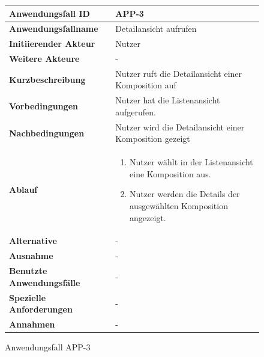 \begin{figure}[h]
	\centering
	\begin{tabularx}{\textwidth}{ X | X }
		\textbf{Anwendungsfall ID} & APP-3 \\ \hline
		\textbf{Anwendungsfallname} & Detailansicht aufrufen \\ \hline
		\textbf{Initiierender Akteur} & Nutzer \\ \hline
		\textbf{Weitere Akteure} & -  \\ \hline
		\textbf{Kurzbeschreibung} & Nutzer ruft die Detailansicht einer Komposition auf  \\ \hline
		\textbf{Vorbedingungen} & Nutzer hat die Listenansicht aufgerufen.  \\ \hline
		\textbf{Nachbedingungen} & Nutzer wird die Detailansicht einer Komposition gezeigt \\ \hline
		\textbf{Ablauf} &
		\begin{enumerate}
			\item Nutzer wählt in der Listenansicht eine Komposition aus.
			\item Nutzer werden die Details der ausgewählten Komposition angezeigt.
		\end{enumerate} \\ \hline
		\textbf{Alternative} &
		-  \\ \hline
		\textbf{Ausnahme} &
		- \\ \hline
		\textbf{Benutzte Anwendungsfälle} & - \\ \hline
		\textbf{Spezielle Anforderungen} & - \\ \hline
		\textbf{Annahmen} & -
	\end{tabularx}
	\caption{Anwendungsfall APP-3}
	\label{fig:anwendungsfall-app-tabelle-APP-3}
\end{figure}

\newpage

